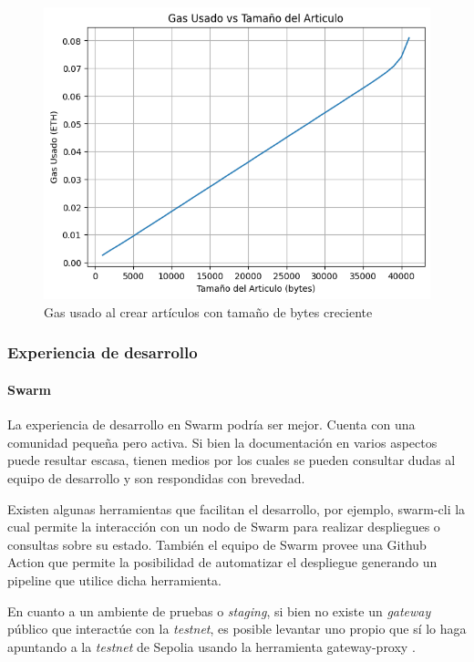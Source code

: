 \begin{figure}[H]
    \centering
    \includegraphics[width=0.75\linewidth]{aw-eth-bytes-articulo-incremental-gas.png}
    \caption{Gas usado al crear artículos con tamaño de bytes creciente}
    \label{fig:aw-eth-bytes-articulo-incremental-gas}
\end{figure}

\subsubsection{Experiencia de desarrollo} %

\paragraph{Swarm}
La experiencia de desarrollo en Swarm podría ser mejor. Cuenta con una comunidad pequeña pero activa. Si bien la documentación en varios aspectos puede resultar escasa, tienen medios por los cuales se pueden consultar dudas al equipo de desarrollo y son respondidas con brevedad.

Existen algunas herramientas que facilitan el desarrollo, por ejemplo, swarm-cli \cite{swarm-cli} la cual permite la interacción con un nodo de Swarm para realizar despliegues o consultas sobre su estado. También el equipo de Swarm provee una Github Action que permite la posibilidad de automatizar el despliegue generando un pipeline que utilice dicha herramienta.

En cuanto a un ambiente de pruebas o \textit{staging}, si bien no existe un \textit{gateway} público que interactúe con la \textit{testnet}, es posible levantar uno propio que sí lo haga apuntando a la \textit{testnet} de Sepolia usando la herramienta gateway-proxy \cite{gateway-proxy}.

